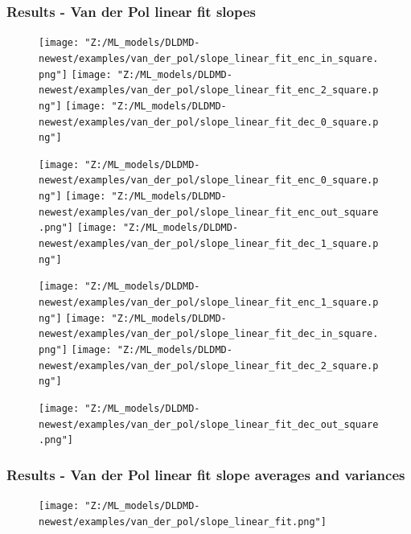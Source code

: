 \documentclass[11pt,aspectratio=169]{beamer}
\begin{document}
    \begin{frame}
        \frametitle{Results - Van der Pol linear fit slopes} 
        \begin{figure}
            \centering
            \begin{minipage}{.3333\textwidth}
                \texttt{[image: "Z:/ML\_models/DLDMD-newest/examples/van\_der\_pol/slope\_linear\_fit\_enc\_in\_square.png"]}
                \texttt{[image: "Z:/ML\_models/DLDMD-newest/examples/van\_der\_pol/slope\_linear\_fit\_enc\_2\_square.png"]}
                \texttt{[image: "Z:/ML\_models/DLDMD-newest/examples/van\_der\_pol/slope\_linear\_fit\_dec\_0\_square.png"]}
            \end{minipage}%
            \begin{minipage}{.3333\textwidth}
                \texttt{[image: "Z:/ML\_models/DLDMD-newest/examples/van\_der\_pol/slope\_linear\_fit\_enc\_0\_square.png"]}
                \texttt{[image: "Z:/ML\_models/DLDMD-newest/examples/van\_der\_pol/slope\_linear\_fit\_enc\_out\_square.png"]}
                \texttt{[image: "Z:/ML\_models/DLDMD-newest/examples/van\_der\_pol/slope\_linear\_fit\_dec\_1\_square.png"]}
            \end{minipage}%
            \begin{minipage}{.3333\textwidth}
                \texttt{[image: "Z:/ML\_models/DLDMD-newest/examples/van\_der\_pol/slope\_linear\_fit\_enc\_1\_square.png"]}
                \texttt{[image: "Z:/ML\_models/DLDMD-newest/examples/van\_der\_pol/slope\_linear\_fit\_dec\_in\_square.png"]}
                \texttt{[image: "Z:/ML\_models/DLDMD-newest/examples/van\_der\_pol/slope\_linear\_fit\_dec\_2\_square.png"]}
            \end{minipage}
            \texttt{[image: "Z:/ML\_models/DLDMD-newest/examples/van\_der\_pol/slope\_linear\_fit\_dec\_out\_square.png"]}
        \end{figure}
    \end{frame}

    \begin{frame}
        \frametitle{Results - Van der Pol linear fit slope averages and variances}
        
        \begin{figure}
            \centering
            \texttt{[image: "Z:/ML\_models/DLDMD-newest/examples/van\_der\_pol/slope\_linear\_fit.png"]}
        \end{figure}
    \end{frame}
\end{document}
